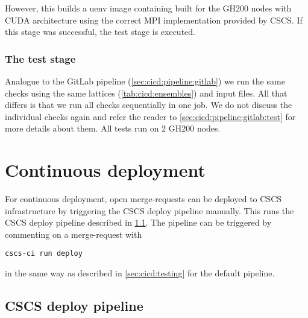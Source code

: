 However, this builds a uenv image containing \quda built for the GH200 nodes with CUDA architecture  using the correct MPI implementation provided by CSCS.
If this stage was successful, the test stage is executed.

\subsubsection{The test stage}

Analogue to the GitLab pipeline (\cref{sec:cicd:pipeline:gitlab}) we run the same checks using the same lattices (\cref{tab:cicd:ensembles}) and input files.
All that differs is that we run all checks sequentially in one job.
We do not discuss the individual checks again and refer the reader to \cref{sec:cicd:pipeline:gitlab:test} for more details about them.
All tests run on \num{2} GH200 nodes.

\section{Continuous deployment}
\label{sec:cicd:deployment}

For continuous deployment, open merge-requests can be deployed to CSCS infrastructure by triggering the CSCS deploy pipeline manually.
This runs the CSCS deploy pipeline described in \cref{sec:cd:pipeline:cscs}.
The pipeline can be triggered by commenting on a merge-request with
\begin{verbatim}
cscs-ci run deploy
\end{verbatim}
in the same way as described in \cref{sec:cicd:testing} for the default pipeline.

\subsection{CSCS deploy pipeline}
\label{sec:cd:pipeline:cscs}

